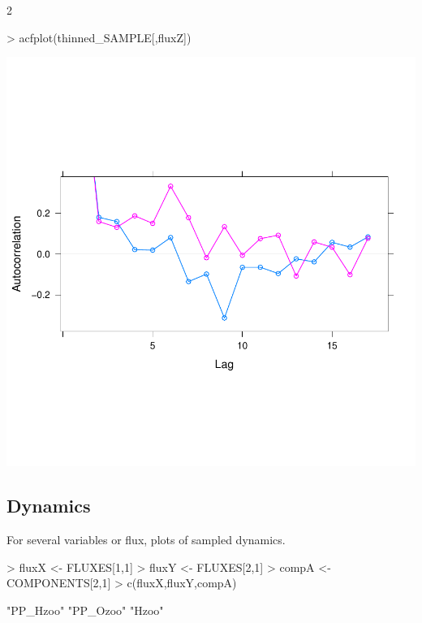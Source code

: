 \documentclass{article}
\begin{document}
\begin{Schunk}
\begin{Soutput}
[1] 2
\end{Soutput}
\begin{Sinput}
> acfplot(thinned_SAMPLE[,fluxZ])
\end{Sinput}
\end{Schunk}
\includegraphics{barents_SM-015}


\clearpage

\subsection{Dynamics}

For several variables or flux, plots of sampled dynamics. 
\begin{Schunk}
\begin{Sinput}
> fluxX <- FLUXES[1,1]
> fluxY <- FLUXES[2,1]
> compA <- COMPONENTS[2,1] 
> c(fluxX,fluxY,compA)
\end{Sinput}
\begin{Soutput}
[1] "PP_Hzoo" "PP_Ozoo" "Hzoo"   
\end{Soutput}
\end{Schunk}
\end{document}
